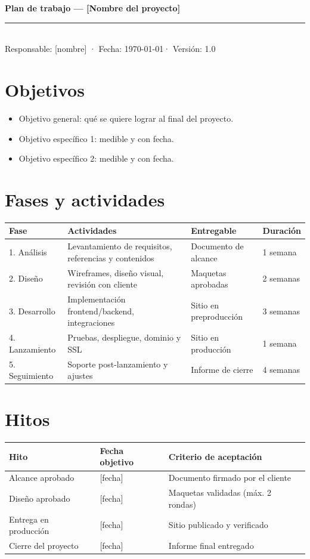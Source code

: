 \documentclass[11pt,a4paper]{article}
\begin{document}
\begin{center}
  {\LARGE\bfseries Plan de trabajo — [Nombre del proyecto]}\\[4pt]
  {\color{marca}\rule{0.4\linewidth}{2pt}}\\[6pt]
  {\small Responsable: [nombre] · Fecha: \today · Versión: 1.0}
\end{center}

\section{Objetivos}
\begin{itemize}
  \item Objetivo general: qué se quiere lograr al final del proyecto.
  \item Objetivo específico 1: medible y con fecha.
  \item Objetivo específico 2: medible y con fecha.
\end{itemize}

\section{Fases y actividades}
\begin{longtable}{p{2.6cm} p{6.2cm} p{3.4cm} p{2.2cm}}
  \toprule
  \textbf{Fase} & \textbf{Actividades} & \textbf{Entregable} & \textbf{Duración}\\
  \midrule
  1. Análisis    & Levantamiento de requisitos, referencias y contenidos & Documento de alcance & 1 semana\\
  2. Diseño      & Wireframes, diseño visual, revisión con cliente       & Maquetas aprobadas   & 2 semanas\\
  3. Desarrollo  & Implementación frontend/backend, integraciones        & Sitio en preproducción & 3 semanas\\
  4. Lanzamiento & Pruebas, despliegue, dominio y SSL                    & Sitio en producción  & 1 semana\\
  5. Seguimiento & Soporte post-lanzamiento y ajustes                    & Informe de cierre    & 4 semanas\\
  \bottomrule
\end{longtable}

\section{Hitos}
\begin{longtable}{p{5.2cm} p{3.2cm} p{6cm}}
  \toprule
  \textbf{Hito} & \textbf{Fecha objetivo} & \textbf{Criterio de aceptación}\\
  \midrule
  Alcance aprobado      & [fecha] & Documento firmado por el cliente\\
  Diseño aprobado       & [fecha] & Maquetas validadas (máx. 2 rondas)\\
  Entrega en producción & [fecha] & Sitio publicado y verificado\\
  Cierre del proyecto   & [fecha] & Informe final entregado\\
  \bottomrule
\end{longtable}
\end{document}
